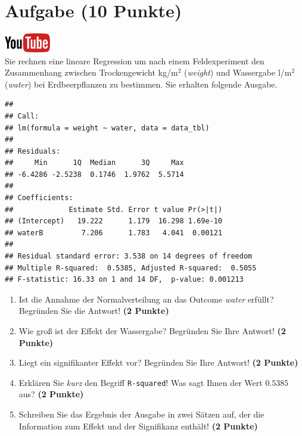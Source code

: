 \documentclass[a4paper, 9pt]{scrartcl}\usepackage[]{graphicx}\usepackage[]{xcolor}
\makeatletter
\newenvironment{kframe}{%
 \def\at@end@of@kframe{}%
 \ifinner\ifhmode%
  \def\at@end@of@kframe{\end{minipage}}%
  \begin{minipage}{\columnwidth}%
 \fi\fi%
 \def\FrameCommand##1{\hskip\@totalleftmargin \hskip-\fboxsep
 \colorbox{shadecolor}{##1}\hskip-\fboxsep
     \hskip-\linewidth \hskip-\@totalleftmargin \hskip\columnwidth}%
 \MakeFramed {\advance\hsize-\width
   \@totalleftmargin\z@ \linewidth\hsize
   \@setminipage}}%
 {\par\unskip\endMakeFramed%
 \at@end@of@kframe}
\newenvironment{knitrout}{}{} %
\makeatother
\begin{document}
\section{Aufgabe \hfill (10 Punkte)}

\hfill\href{https://youtu.be/tNNzcndrpSk}{\includegraphics[width =
  2cm]{img/youtube}}\\[1Ex]

Sie rechnen eine lineare Regression um nach einem Feldexperiment den
Zusammenhang zwischen Trockengewicht kg/m$^2$ (\textit{weight}) und
Wassergabe l/m$^2$ (\textit{water}) bei Erdbeerpflanzen zu bestimmen. Sie
erhalten folgende \Rlogo Ausgabe.

\begin{knitrout}
\color{fgcolor}\begin{kframe}
\begin{verbatim}
## 
## Call:
## lm(formula = weight ~ water, data = data_tbl)
## 
## Residuals:
##     Min      1Q  Median      3Q     Max 
## -6.4286 -2.5238  0.1746  1.9762  5.5714 
## 
## Coefficients:
##             Estimate Std. Error t value Pr(>|t|)
## (Intercept)   19.222      1.179  16.298 1.69e-10
## waterB         7.206      1.783   4.041  0.00121
## 
## Residual standard error: 3.538 on 14 degrees of freedom
## Multiple R-squared:  0.5385,	Adjusted R-squared:  0.5055 
## F-statistic: 16.33 on 1 and 14 DF,  p-value: 0.001213
\end{verbatim}
\end{kframe}
\end{knitrout}


\begin{enumerate}
\item Ist die Annahme der Normalverteilung an das Outcome \textit{water}
  erf{\"u}llt?  Begr{\"u}nden Sie die Antwort! \textbf{(2 Punkte)}
\item Wie gro{\ss} ist der Effekt der Wassergabe?  Begr{\"u}nden Sie Ihre Antwort! \textbf{(2 Punkte)} 
\item Liegt ein signifikanter
  Effekt vor? Begr{\"u}nden Sie Ihre Antwort! \textbf{(2 Punkte)}
\item Erkl{\"a}ren Sie \textit{kurz} den Begriff \texttt{R-squared}!
  Was sagt Ihnen der Wert $0.5385$ aus? \textbf{(2 Punkte)}
\item Schreiben Sie das Ergebnis der \Rlogo Ausgabe in zwei S{\"a}tzen auf, der die
  Information zum Effekt und der Signifikanz enth{\"a}lt! \textbf{(2 Punkte)} 
\end{enumerate}
 
\end{document}
